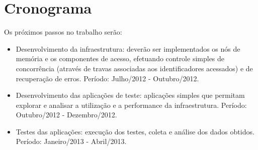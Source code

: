 \documentclass[11pt,twoside,a4paper]{book}
\renewcommand{\chaptermark}[1]{\markboth{\MakeUppercase{#1}}{}}
\begin{document}
\chapter{Cronograma}
\label{chap:cronograma}
Os próximos passos no trabalho serão:

\begin{itemize}
\item Desenvolvimento da infraestrutura: deverão ser implementados os nós de memória e os componentes de acesso, efetuando controle simples de concorrência (através de travas associadas aos identificadores acessados) e de recuperação de erros. Período: Julho/2012 - Outubro/2012.
\item Desenvolvimento das aplicações de teste: aplicações simples que permitam explorar e analisar a utilização e a performance da infraestrutura. Período: Outubro/2012 - Dezembro/2012.
\item Testes das aplicações: execução dos testes, coleta e análise dos dados obtidos. Período: Janeiro/2013 - Abril/2013.
\end{itemize}

\renewcommand{\chaptermark}[1]{\markboth{\MakeUppercase{\appendixname\ \thechapter}} {\MakeUppercase{#1}} }
\fancyhead[RE,LO]{}
\appendix

% 

\backmatter \singlespacing   %

\end{document}
